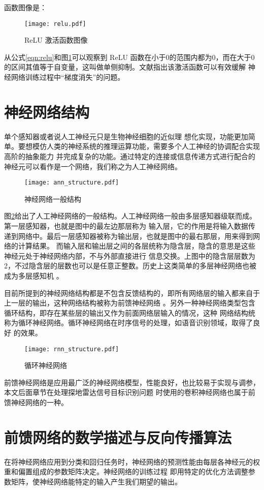 函数图像是：
\begin{figure}[htbp]
	\texttt{[image: relu.pdf]}
	\caption{ReLU 激活函数图像}
	\label{relu}
\end{figure}

从公式\ref{eqn:relu}和图\ref{relu}可以观察到 ReLU 函数在小于0的范围内都为0，而在大于0的区间其值等于自变量，这叫做单侧抑制。文献\cite{glorot2011deep}指出该激活函数可以有效缓解
神经网络训练过程中“梯度消失”的问题。

\section{神经网络结构}
单个感知器或者说人工神经元只是生物神经细胞的近似理
想化实现，功能更加简单。要想模仿人类的神经系统的推理运算功能，需要多个人工神经的协调配合实现高阶的抽象能力
并完成复杂的功能。通过特定的连接或信息传递方式进行配合的神经元可以看作是一个网络，我们称之为人工神经网络。

\begin{figure}[htbp]
	\texttt{[image: ann\_structure.pdf]}
	\caption{神经网络一般结构}
	\label{ann_structure}
\end{figure}

图\ref{ann_structure}给出了人工神经网络的一般结构。人工神经网络一般由多层感知器级联而成。第一层感知器，也就是图中的最左边那层称为
输入层，它的作用是将输入数据传递到网络中。最后一层感知器被称为输出层，也就是图中的最右那层，用来得到网络的计算结果。
而输入层和输出层之间的各层统称为隐含层，隐含的意思是这些神经元处于神经网络内部，不与外部直接进行
信息交换。上图中的隐含层层数为 2，不过隐含层的层数也可以是任意正整数。历史上这类简单的多层神经网络也被成为多层感知机
。

目前所提到的神经网络结构都是不包含反馈结构的，即所有网络层的输入都来自于上一层的输出，这种网络结构被称为前馈神经网络
。另外一种神经网络类型包含循环结构，即存在某些层的输出又作为前面网络层输入的情况，这种
网络结构统称为循环神经网络。循环神经网络在时序信号的处理，如语音识别领域，取得了良好
的效果。

\begin{figure}[htbp]
	\texttt{[image: rnn\_structure.pdf]}
	\caption{循环神经网络}
	\label{rnn_structure}
\end{figure}

前馈神经网络是应用最广泛的神经网络模型，性能良好，也比较易于实现与调参，本文后面章节在处理探地雷达信号目标识别问题
时使用的卷积神经网络也属于前馈神经网络的一种。

\section{前馈网络的数学描述与反向传播算法}
在将神经网络应用到分类和回归任务时，神经网络的预测性能由每层各神经元的权重和偏置组成的参数矩阵决定。神经网络的训练过程
即用特定的优化方法调整参数矩阵，使神经网络能特定的输入产生我们期望的输出。

